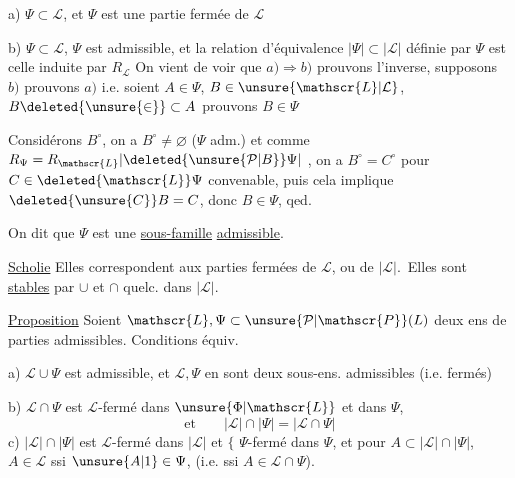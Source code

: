 a) $\Psi\subset\mathscr{L}$, et $\Psi$ est une partie fermée de $\mathscr{L}$

b) $\Psi\subset\mathscr{L}$, $\Psi$ est admissible,  et la relation d'équivalence   $|\Psi|\subset|\mathscr{L}|$ définie par $\Psi$ est celle induite par $R_{\mathscr{L}}$
On vient de voir que $a)\Rightarrow b)$ prouvons l'inverse, supposons $b)$ prouvons $a)$ i.e. soient $A\in\Psi$, $B\in\unsure{\mathscr{L}|\mathcal{L}}$, $B\deleted{\unsure{\in}}\subset A$ prouvons $B\in\Psi$

Considérons $B^\circ$, on a $B^\circ\ne\varnothing$ ($\Psi$ adm.) et comme $R_\Psi=R_{\mathscr{L}}\lvert\deleted{\unsure{\mathcal{P}|B}}\Psi\rvert$ , on a $B^\circ=C^\circ$ pour $C\in\deleted{\mathscr{L}}\Psi$ convenable, puis cela implique $\deleted{\unsure{C}}B=C$, donc $B\in\Psi$, qed.

On dit que $\Psi$ est une \uline{sous-famille} \uline{admissible}.

\uline{Scholie} Elles correspondent  aux parties fermées de $\mathscr{L}$, ou de $|\mathscr{L}|$. \unsure{\ensuremath{\Rightarrow}|=}\,Elles sont \uline{stables} par $\cup$ et $\cap$ quelc. dans $|\mathscr{L}|$.

\uline{Proposition} Soient $\mathscr{L},\Psi\subset\unsure{\mathcal{P}|\mathscr{P}}(L)$ deux ens de parties admissibles. Conditions équiv.

a) $\mathscr{L}\cup\Psi$ est admissible, et $\mathscr{L},\Psi$ en sont deux sous-ens. admissibles (i.e. fermés)

b) $\mathscr{L}\cap\Psi$ est $\mathscr{L}$-fermé dans $\unsure{\Phi|\mathscr{L}}$ et  dans $\Psi$,
\[
 \text{et}\qquad |\mathscr{L}|\cap|\Psi|=|\mathscr{L}\cap\Psi|
\]
c) $|\mathscr{L}|\cap|\Psi|$ est $\mathscr{L}$-fermé dans $|\mathscr{L}|$ et \ensuremath{\{} $\Psi$-fermé dans $\Psi$, et   pour $A\subset|\mathscr{L}|\cap|\Psi|$, $A\in\mathscr{L}$  ssi $\unsure{A|1}\in\Psi$, (i.e. ssi $A\in\mathscr{L}\cap\Psi$).



